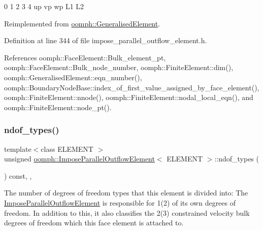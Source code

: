 0 1 2 3 4 up vp wp L1 L2 

Reimplemented from \hyperlink{classoomph_1_1GeneralisedElement_a069f59bfc3e607a5bebba52c6314d777}{oomph\+::\+Generalised\+Element}.



Definition at line 344 of file impose\+\_\+parallel\+\_\+outflow\+\_\+element.\+h.



References oomph\+::\+Face\+Element\+::\+Bulk\+\_\+element\+\_\+pt, oomph\+::\+Face\+Element\+::\+Bulk\+\_\+node\+\_\+number, oomph\+::\+Finite\+Element\+::dim(), oomph\+::\+Generalised\+Element\+::eqn\+\_\+number(), oomph\+::\+Boundary\+Node\+Base\+::index\+\_\+of\+\_\+first\+\_\+value\+\_\+assigned\+\_\+by\+\_\+face\+\_\+element(), oomph\+::\+Finite\+Element\+::nnode(), oomph\+::\+Finite\+Element\+::nodal\+\_\+local\+\_\+eqn(), and oomph\+::\+Finite\+Element\+::node\+\_\+pt().

\mbox{\label{classoomph_1_1ImposeParallelOutflowElement_a3d403d29fdcbbc8954ae360331d03be4}} 
\subsubsection{\texorpdfstring{ndof\+\_\+types()}{ndof\_types()}}
{\footnotesize\ttfamily template$<$class E\+L\+E\+M\+E\+NT $>$ \\
unsigned \hyperlink{classoomph_1_1ImposeParallelOutflowElement}{oomph\+::\+Impose\+Parallel\+Outflow\+Element}$<$ E\+L\+E\+M\+E\+NT $>$\+::ndof\+\_\+types (\begin{DoxyParamCaption}{ }\end{DoxyParamCaption}) const\hspace{0.3cm}{\ttfamily [inline]}, {\ttfamily [protected]}, {\ttfamily [virtual]}}



The number of degrees of freedom types that this element is divided into\+: The \hyperlink{classoomph_1_1ImposeParallelOutflowElement}{Impose\+Parallel\+Outflow\+Element} is responsible for 1(2) of it\textquotesingle{}s own degrees of freedom. In addition to this, it also classifies the 2(3) constrained velocity bulk degrees of freedom which this face element is attached to. 



